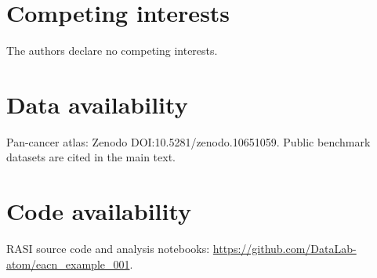 \documentclass[10pt]{article}
\begin{document}
\section*{Competing interests}
The authors declare no competing interests.

\section*{Data availability}
Pan-cancer atlas: Zenodo DOI:10.5281/zenodo.10651059. Public benchmark datasets are cited in the main text.

\section*{Code availability}
RASI source code and analysis notebooks: \url{https://github.com/DataLab-atom/eacn_example_001}.
\end{document}
